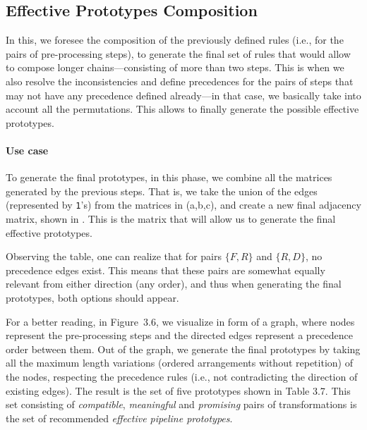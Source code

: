 \subsection{Effective Prototypes Composition}
\label{effective-ssec:composition}

In this, we foresee the composition of the previously defined rules (i.e., for the pairs of pre-processing steps), to generate the final set of rules that would allow to compose longer chains---consisting of more than two steps.
This is when we also resolve the inconsistencies and define precedences for the pairs of steps that may not have any precedence defined already---in that case, we basically take into account all the permutations.
This allows to finally generate the possible effective  prototypes.

\paragraph{Use case}
To generate the final prototypes, in this phase, we combine all the matrices generated by the previous steps.
That is, we take the union of the edges (represented by \texttt{1}'s) from the matrices in  (a,b,c), and create a new final adjacency matrix, shown in .
This is the matrix that will allow us to generate the final effective prototypes.

Observing the table, one can realize that for pairs $\{F,R\}$ and $\{R,D\}$, no precedence edges exist.
This means that these pairs are somewhat equally relevant from either direction (any order), and thus when generating the final prototypes, both options should appear.

For a better reading, in Figure~3.6, we visualize  in form of a graph, where nodes represent the pre-processing steps and the directed edges represent a precedence order between them.
Out of the graph, we generate the final prototypes by taking all the maximum length variations (ordered arrangements without repetition) of the nodes, respecting the precedence rules (i.e., not contradicting the direction of existing edges).
The result is the set of five prototypes shown in Table 3.7. This set consisting of \textit{compatible}, \textit{meaningful} and \textit{promising} pairs of transformations is the set of recommended \textit{effective pipeline prototypes}.


